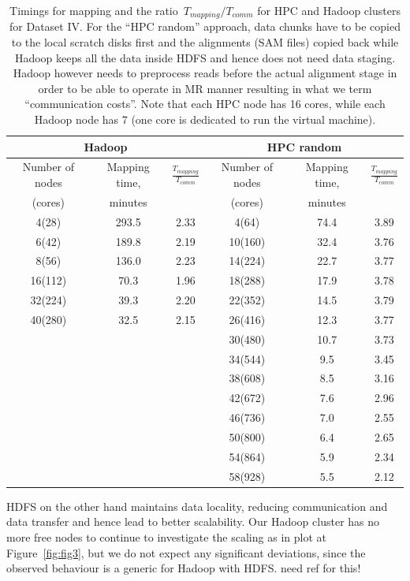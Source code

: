 \documentclass[11pt, oneside]{article}   	%
\newcommand{\COMMENT}[1]{{\color{red} #1 }}
\begin{document}
\begin{table}[htdp]
\caption{Timings  for mapping and the ratio~$T_{mapping}/T_{comm}$ for HPC and Hadoop clusters for Dataset IV.
For the ``HPC random'' approach, data chunks have to be copied to the local scratch disks first and the alignments (SAM files) copied back while Hadoop keeps all the data inside HDFS and hence does not need data staging. Hadoop however needs to preprocess reads before the actual alignment stage in order to be able to operate in MR manner resulting in what we term ``communication costs''. Note that each HPC node has 16 cores, while each Hadoop node has 7 (one core is dedicated to run the virtual machine).}
\begin{center}
\begin{tabular}{c|c|c|c|c|c}
 \multicolumn{3}{c|}{Hadoop} & \multicolumn{3}{c}{ HPC random} \\
 \hline		


Number of nodes	&Mapping time,	&$\frac{T_{mapping}}{T_{comm}}$	&Number of nodes	&Mapping time,	&$\frac{T_{mapping}}{T_{comm}}$\\
(cores)					&minutes		&							&(cores)			&minutes&\\
\hline
4(28)	&293.5	&2.33	&4(64)	&74.4	&3.89\\
6(42)	&189.8	&2.19	&10(160)	&32.4	&3.76\\
8(56)	&136.0	&2.23	&14(224)	&22.7	&3.77\\
16(112)	&70.3	&1.96	&18(288)	&17.9	&3.78\\
32(224)	&39.3	&2.20	&22(352)	&14.5	&3.79\\
40(280)	&32.5	&2.15	&26(416)	&12.3	&3.77\\
			&&&30(480)	&10.7	&3.73\\
			&&&34(544)	&9.5	&3.45\\
			&&&38(608)	&8.5	&3.16\\
			&&&42(672)	&7.6	&2.96\\
			&&&46(736)	&7.0	&2.55\\
			&&&50(800)	&6.4	&2.65\\
			&&&54(864)	&5.9	&2.34\\
			&&&58(928)	&5.5	&2.12\\

\end{tabular}
\end{center}
\label{table:6}
\end{table}%
HDFS on the other hand maintains data locality, reducing communication and data transfer and hence lead to better scalability.
Our Hadoop cluster has no more free nodes to continue to investigate the scaling as in plot at Figure~\ref{fig:fig3}, but we do not expect any significant deviations, since the observed behaviour is a generic for Hadoop with HDFS. \COMMENT{need ref for this!}
\end{document}
